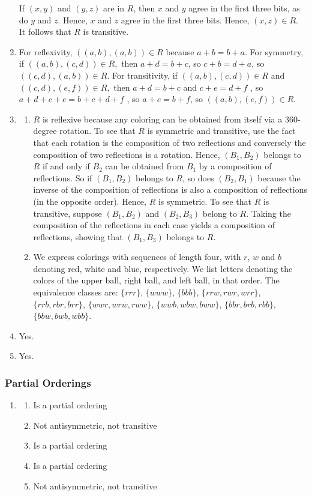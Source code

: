 \documentclass{sig-alternate-05-2015}
\begin{document}
\begin{enumerate}
If $(x, y)$ and $(y, z)$ are in $R$, then
$x$ and $y$ agree in the first three bits, as do $y$ and $z$. Hence, $x$
and $z$ agree in the first three bits. Hence, $(x, z) \in R.$ It follows
that $R$ is transitive.

\item
For reflexivity,
$((a, b), (a, b))\in R$ because $a +b = b +a$. For symmetry, if
$((a, b), (c, d))\in R,$ then $a + d = b + c$, so $c + b = d + a$,
so $((c, d), (a, b))\in R.$ For transitivity, if $((a, b), (c, d)) \in R$
 and $((c, d), (e, f )) \in R,$ then $a+d = b+c$ and $c+e = d+f$ ,
so $a + d + c + e = b + c + d + f$ , so $a + e = b + f $,
so $((a, b), (e, f ))\in R.$ 

\item 
\begin{enumerate}
	\item $R$ is
	reflexive because any coloring can be obtained from itself via
	a 360-degree rotation. To see that $R$ is symmetric and transitive,
	use the fact that each rotation is the composition of two reflections and conversely the composition of two reflections
	is a rotation. Hence, $(B_1, B_2)$ belongs to $R$ if and only
	if $B_2$ can be obtained from $B_1$ by a composition of reflections.
	So if $(B_1, B_2)$ belongs to $R$, so does $(B_2, B_1)$ because
	the inverse of the composition of reflections is also a composition
	of reflections (in the opposite order). Hence, $R$ is
	symmetric. To see that $R$ is transitive, suppose $(B_1, B_2)$ and
	$(B_2, B_3)$ belong to $R$. Taking the composition of the reflections
	in each case yields a composition of reflections, showing
	that $(B_1,B_3)$ belongs to $R$. 
	\item We express colorings with sequences
	of length four, with $r$, $w$ and $b$ denoting red, white and blue,
	respectively. We list letters denoting the colors of the upper
	ball, right ball, and left ball, in that order. The equivalence classes are: $\{rrr\}$, $\{www\}$, $\{bbb\}$, $\{rrw, rwr, wrr\}$, $\{rrb, rbr, brr\}$, $\{wwr, wrw, rww\}$, $\{wwb, wbw, bww\}$, $\{bbr, brb, rbb\}$, $\{bbw, bwb, wbb\}$.
\end{enumerate}

\item Yes.

\item Yes.
\end{enumerate}

\subsubsection{Partial Orderings}
\begin{enumerate}
\item 
\begin{enumerate}
	\item Is a partial ordering 
	\item Not antisymmetric, not transitive 
	\item Is a partial ordering 
	\item Is a partial ordering 
	\item Not antisymmetric, not transitive
\end{enumerate}
\end{enumerate}
\end{document}
